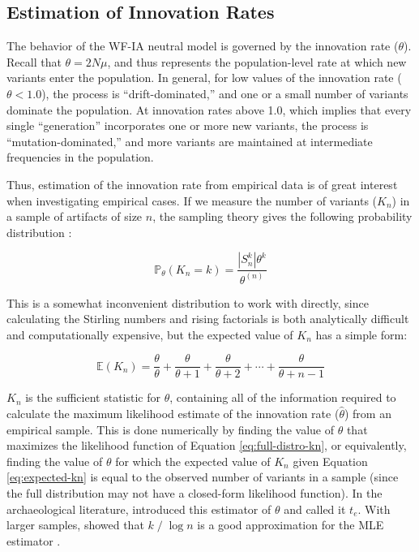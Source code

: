 \subsection{Estimation of Innovation Rates}
\label{ta:sec:theta-estimation-theory}

The behavior of the WF-IA neutral model is governed by the innovation rate ($\theta$).  Recall that $\theta = 2 N \mu$, and thus represents the population-level rate at which new variants enter the population.  In general, for low values of the innovation rate ($\theta < 1.0$), the process is ``drift-dominated,'' and one or a small number of variants dominate the population.  At innovation rates above 1.0, which implies that every single ``generation'' incorporates one or more new variants, the process is ``mutation-dominated,'' and more variants are maintained at intermediate frequencies in the population.  

Thus, estimation of the innovation rate from empirical data is of great interest when investigating empirical cases.   If we measure the number of variants ($K_n$) in a sample of artifacts of size $n$, the sampling theory  gives the following probability distribution \citep[Eq. 3.84]{Ewens2004}:

\begin{equation} 
\label{eq:full-distro-kn}
	\mathbb{P}_{\theta}(K_n = k) = \frac{|S^k_n| \theta^k}{\theta^{(n)}}
\end{equation}

This is a somewhat inconvenient distribution to work with directly, since calculating the Stirling numbers and rising factorials is both analytically difficult and computationally expensive, but the expected value of $K_n$ has a simple form:

\begin{equation} 
\label{eq:expected-kn}
	\mathbb{E}(K_n) = \frac{\theta}{\theta} + \frac{\theta}{\theta + 1} + \frac{\theta}{\theta + 2} + \cdots + \frac{\theta}{\theta + n - 1}
\end{equation}

$K_n$ is the sufficient statistic for $\theta$, containing all of the information required to calculate the maximum likelihood estimate of the innovation rate ($\hat{\theta}$) from an empirical sample.  This is done numerically by finding the value of $\theta$ that maximizes the likelihood function of Equation \ref{eq:full-distro-kn}, or equivalently, finding the value of $\theta$ for which the expected value of $K_n$ given Equation \ref{eq:expected-kn} is equal to the observed number of variants in a sample (since the full distribution may not have a closed-form likelihood function).  In the archaeological literature, \citet{Neiman1995} introduced this estimator of $\theta$ and called it $t_e$.  With larger samples, \citet{watterson1975number} showed that $k\;/\;\log n$ is a good approximation for the MLE estimator \citep{durrett2008}.  

